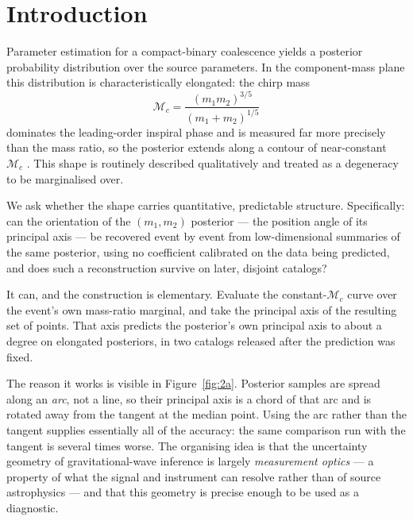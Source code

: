 \documentclass[aps,prd,twocolumn,amsmath,amssymb,nofootinbib,superscriptaddress]{revtex4-2}
\begin{document}
\section{Introduction}
\label{sec:intro}
Parameter estimation for a compact-binary coalescence yields a posterior probability distribution over the
source parameters. In the component-mass plane this distribution is characteristically elongated: the chirp
mass
\begin{equation}
\mathcal{M}_c = \frac{(m_1 m_2)^{3/5}}{(m_1+m_2)^{1/5}}
\end{equation}
dominates the leading-order inspiral phase and is measured far more precisely than the mass ratio, so the
posterior extends along a contour of near-constant $\mathcal{M}_c$ \citep{CutlerFlanagan1994,
PoissonWill1995, Hannam2013}. This shape is routinely described qualitatively and treated as a degeneracy
to be marginalised over.

We ask whether the shape carries quantitative, predictable structure. Specifically: can the orientation of
the $(m_1,m_2)$ posterior --- the position angle of its principal axis --- be recovered event by event from
low-dimensional summaries of the same posterior, using no coefficient calibrated on the data being
predicted, and does such a reconstruction survive on later, disjoint catalogs?

It can, and the construction is elementary. Evaluate the constant-$\mathcal{M}_c$ curve over the event's
own mass-ratio marginal, and take the principal axis of the resulting set of points. That axis predicts the
posterior's own principal axis to about a degree on elongated posteriors, in two catalogs released after
the prediction was fixed.

The reason it works is visible in Figure~\ref{fig:2a}. Posterior samples are spread along an \emph{arc},
not a line, so their principal axis is a chord of that arc and is rotated away from the tangent at the
median point. Using the arc rather than the tangent supplies essentially all of the accuracy: the same
comparison run with the tangent is several times worse. The organising idea is that the uncertainty
geometry of gravitational-wave inference is largely \emph{measurement optics} --- a property of what the
signal and instrument can resolve rather than of source astrophysics --- and that this geometry is precise
enough to be used as a diagnostic.
\end{document}
